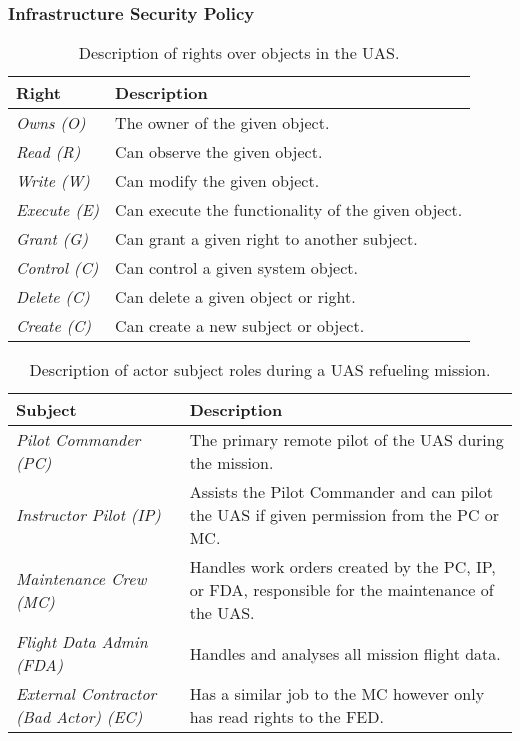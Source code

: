 \documentclass[10pt,journal,compsoc]{IEEEtran}
\begin{document}
\subsubsection{Infrastructure Security Policy}

\begin{table}[]
  \caption{Description of rights over objects in the UAS.}
  \begin{tabular}{ll}
  \hline
  \textbf{Right}       & \textbf{Description}                               \\ 
  \hline
  \textit{Owns (O)}    & The owner of the given object.                     \\
  \textit{Read (R)}    & Can observe the given object.                      \\
  \textit{Write (W)}   & Can modify the given object.                       \\
  \textit{Execute (E)} & Can execute the functionality of the given object. \\
  \textit{Grant (G)}   & Can grant a given right to another subject.        \\
  \textit{Control (C)} & Can control a given system object.                 \\
  \textit{Delete (C)}  & Can delete a given object or right.                 \\
  \textit{Create (C)}  & Can create a new subject or object.                 \\
  \hline
  \end{tabular}
\end{table}

\begin{table*}[]
  \caption{Description of actor subject roles during a UAS refueling mission.}
  \begin{tabular}{ll}
  \hline
  \textbf{Subject}                           & \textbf{Description}                                                                                       \\ 
  \hline
  \textit{Pilot Commander (PC)}                  & The primary remote pilot of the UAS during the mission.                                                    \\
  \textit{Instructor Pilot (IP)}                 & Assists the Pilot Commander and can pilot the UAS if given permission from the PC or MC.                   \\
  \textit{Maintenance Crew (MC)}                 & Handles work orders created by the PC, IP, or FDA, responsible for the maintenance of the UAS.             \\
  \textit{Flight Data Admin (FDA)}               & Handles and analyses all mission flight data.                                                              \\
  \textit{External Contractor (Bad Actor) (EC)}  & Has a similar job to the MC however only has read rights to the FED.                                       \\
  \hline
  \end{tabular}
\end{table*}
\end{document}
